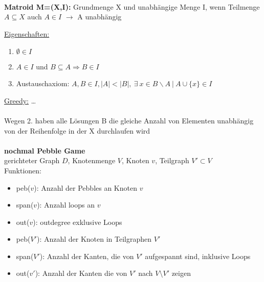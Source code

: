 \documentclass[12pt,a4paper]{article}
\begin{document}
\\\\\\
\parbox{\linewidth}{
\textbf{Matroid M=(X,I):} Grundmenge X und unabhängige Menge I, wenn Teilmenge $A\subseteq X$ auch $A \in I$ $\rightarrow$ A unabhängig

\underline{Eigenschaften:}
\begin{enumerate}
	\item $\emptyset \in I$
	\item $A \in I$ und $B \subseteq A \Rightarrow B \in I$
	\item Austauschaxiom: $A,B \in I, |A| < |B|,\ \exists\ x \in B \backslash A\ |\ A \cup \{x\} \in I$
\end{enumerate}
}
\underline{Greedy:} …
\\\\
Wegen 2. haben alle Lösungen B die gleiche Anzahl von Elementen unabhängig von der Reihenfolge in der X durchlaufen wird
\\\\
\textbf{nochmal Pebble Game}\\
gerichteter Graph $D$, Knotenmenge $V$, Knoten $v$, Teilgraph $V' \subset V$\\
Funktionen:
\begin{itemize}
	\item peb($v$): Anzahl der Pebbles an Knoten $v$
	\item span($v$): Anzahl loops an $v$
	\item out($v$): outdegree exklusive Loops
	\item peb($V'$): Anzahl der Knoten in Teilgraphen $V'$
	\item span($V'$): Anzahl der Kanten, die von $V'$ aufgespannt sind, inklusive Loops
	\item out($v'$): Anzahl der Kanten die von $V'$ nach $V \setminus V'$ zeigen
\end{itemize}
\end{document}
